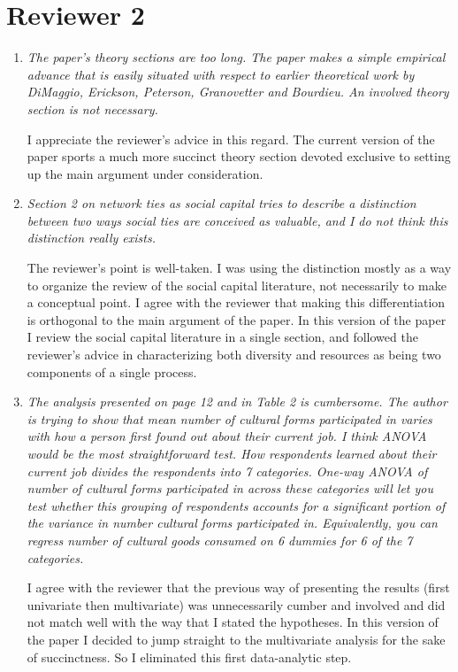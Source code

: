 \documentclass[11pt]{article}
\begin{document}
\section{Reviewer 2}
\begin{enumerate}
	\item \emph{The paper's theory sections are too long. The paper makes a simple empirical advance that is easily situated with respect to earlier theoretical work by DiMaggio, Erickson, Peterson, Granovetter and Bourdieu. An involved theory section is not necessary.}
	
	I appreciate the reviewer's advice in this regard.  The current version of the paper sports a much more succinct theory section devoted exclusive to setting up the main argument under consideration.
	
	\item \emph{Section 2 on network ties as social capital tries to describe a distinction between two ways social ties are conceived as valuable, and I do not think this distinction really exists.} 
		
		The reviewer's point is well-taken.  I was using the distinction mostly as a way to organize the review of the social capital literature, not necessarily to make a conceptual point.  I agree with the reviewer that making this differentiation is orthogonal to the main argument of the paper.  In this version of the paper I review the social capital literature in a single section, and followed the reviewer's advice in characterizing both diversity and resources as being two components of a single process.
	
	\item \emph{The analysis presented on page 12 and in Table 2 is cumbersome. The author is trying to show that mean number of cultural forms participated in varies with how a person first found out about their current job. I think ANOVA would be the most straightforward test. How respondents learned about their current job divides the respondents into 7 categories. One-way ANOVA of number of cultural forms participated in across these categories will let you test whether this grouping of respondents accounts for a significant portion of the variance in number cultural forms participated in.  Equivalently, you can regress number of cultural goods consumed on 6 dummies for 6 of the 7 categories.}
	
	I agree with the reviewer that the previous way of presenting the results (first univariate then multivariate) was unnecessarily cumber and involved and did not match well with the way that I stated the hypotheses.  In this version of the paper I decided to jump straight to the multivariate analysis for the sake of succinctness.  So I eliminated this first data-analytic step.
	

\end{enumerate}
\end{document}
